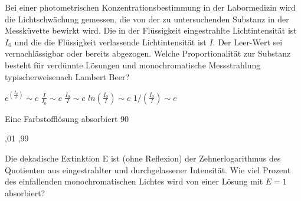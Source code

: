 \documentclass[11pt]{exam}
\begin{document}
\setlength{\voffset}{-0.5in}
\setlength{\headsep}{5pt}

\hspace{2mm}
 \hspace{5mm}
\vspace{4mm}

\begin{questions}

\question Bei einer photometrischen Konzentrationsbestimmung in der Labormedizin wird die Lichtschwächung gemessen, die von der zu untersuchenden Substanz in der Messküvette bewirkt wird. Die in der Flüssigkeit eingestrahlte Lichtintensität ist \( I_0 \) und die die Flüssigkeit verlassende Lichtintensität ist \(I\). Der Leer-Wert sei vernachlässigbar oder bereits abgezogen. Welche Proportionalität zur Substanz besteht für verdünnte Lösungen und monochromatische Messstrahlung typischerweisenach Lambert Beer?

\begin{choices}
	\choice \( e^{( \frac{I_0}{I})} \sim c \)
	\choice \( \frac{I}{I_0} \sim c \)
	\choice \( \frac{I_0}{I} \sim c \)
	\choice \( ln ( \frac{I_0}{I}) \sim c \)
	\choice \( 1/( \frac{I_0}{I}) \sim c \)
\end{choices}

\vspace{3mm}\question Eine Farbstofflösung absorbiert 90 %

\begin{choices}
	,01
	,99
\end{choices}

\vspace{3mm}\question Die dekadische Extinktion E ist (ohne Reflexion) der Zehnerlogarithmus des Quotienten aus eingestrahlter und durchgelassener Intensität. Wie viel Prozent des einfallenden monochromatischen Lichtes wird von einer Lösung mit \(E = 1\) absorbiert?

\begin{choices}
\end{choices}


\end{questions}
\end{document}
